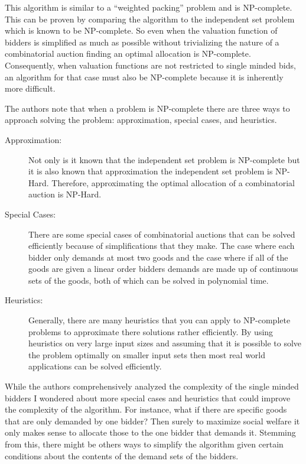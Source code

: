 \documentclass[10pt,onecolumn,letterpaper]{article}
\theoremstyle{definition}
\begin{document}
This algorithm is similar to a ``weighted packing'' problem and is NP-complete. This can be proven by comparing the algorithm to the independent set problem which is known to be NP-complete. So even when the valuation function of bidders is simplified as much as possible without trivializing the nature of a combinatorial auction finding an optimal allocation is NP-complete. Consequently, when valuation functions are not restricted to single minded bids, an algorithm for that case must also be NP-complete because it is inherently more difficult. 

The authors note that when a problem is NP-complete there are three ways to approach solving the problem: approximation, special cases, and heuristics. 

\begin{description}
  \item [Approximation:] Not only is it known that the independent set problem is NP-complete but it is also known that approximation the independent set problem is NP-Hard. Therefore, approximating the optimal allocation of a combinatorial auction is NP-Hard.

  \item [Special Cases:] There are some special cases of combinatorial auctions that can be solved efficiently because of simplifications that they make. The case where each bidder only demands at most two goods and the case where if all of the goods are given a linear order bidders demands are made up of continuous sets of the goods, both of which can be solved in polynomial time.

  \item [Heuristics:] Generally, there are many heuristics that you can apply to NP-complete problems to approximate there solutions rather efficiently. By using heuristics on very large input sizes and assuming that it is possible to solve the problem optimally on smaller input sets then most real world applications can be solved efficiently. 

\end{description}

While the authors comprehensively analyzed the complexity of the single minded bidders I wondered about more special cases and heuristics that could improve the complexity of the algorithm. For instance, what if there are specific goods that are only demanded by one bidder? Then surely to maximize social welfare it only makes sense to allocate those to the one bidder that demands it. Stemming from this, there might be others ways to simplify the algorithm given certain conditions about the contents of the demand sets of the bidders.
\end{document}

